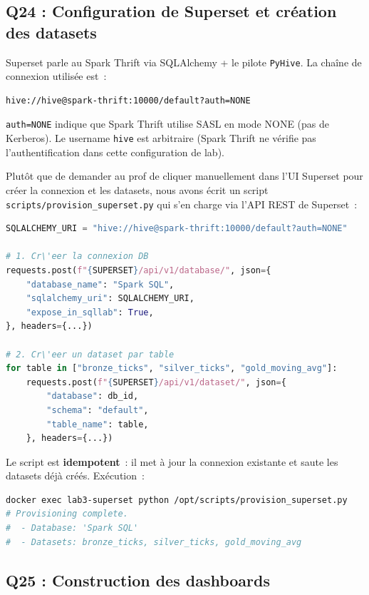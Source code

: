 \documentclass{RapportINPTCLOUD}
\begin{document}
\subsection{Q24 : Configuration de Superset et cr\'{e}ation des datasets}

Superset parle au Spark Thrift via SQLAlchemy + le pilote \texttt{PyHive}. La cha\^{i}ne de connexion utilis\'{e}e est~:

\begin{lstlisting}[style=code]
hive://hive@spark-thrift:10000/default?auth=NONE
\end{lstlisting}

\texttt{auth=NONE} indique que Spark Thrift utilise SASL en mode \og NONE\fg{} (pas de Kerberos). Le username \texttt{hive} est arbitraire (Spark Thrift ne v\'{e}rifie pas l'authentification dans cette configuration de lab).

Plut\^{o}t que de demander au prof de cliquer manuellement dans l'UI Superset pour cr\'{e}er la connexion et les datasets, nous avons \'{e}crit un script \texttt{scripts/provision\_superset.py} qui s'en charge via l'API REST de Superset~:

\begin{lstlisting}[style=code, language=Python, caption=provision\_superset.py (extrait)]
SQLALCHEMY_URI = "hive://hive@spark-thrift:10000/default?auth=NONE"

# 1. Cr\'eer la connexion DB
requests.post(f"{SUPERSET}/api/v1/database/", json={
    "database_name": "Spark SQL",
    "sqlalchemy_uri": SQLALCHEMY_URI,
    "expose_in_sqllab": True,
}, headers={...})

# 2. Cr\'eer un dataset par table
for table in ["bronze_ticks", "silver_ticks", "gold_moving_avg"]:
    requests.post(f"{SUPERSET}/api/v1/dataset/", json={
        "database": db_id,
        "schema": "default",
        "table_name": table,
    }, headers={...})
\end{lstlisting}

Le script est \textbf{idempotent}~: il met \`{a} jour la connexion existante et saute les datasets d\'{e}j\`{a} cr\'{e}\'{e}s. Ex\'{e}cution~:

\begin{lstlisting}[style=code, language=bash]
docker exec lab3-superset python /opt/scripts/provision_superset.py
# Provisioning complete.
#  - Database: 'Spark SQL'
#  - Datasets: bronze_ticks, silver_ticks, gold_moving_avg
\end{lstlisting}

\subsection{Q25 : Construction des dashboards}
\end{document}
